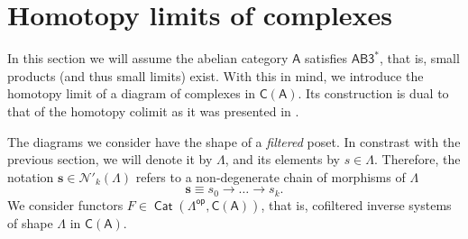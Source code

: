 \documentclass[reqno,11pt]{amsart}
\theoremstyle{plain}
\theoremstyle{remark}
\theoremstyle{definition}
\numberwithin{equation}{thm}
\newcommand{\CN}{\mathcal{N}}
\newcommand{\SA}{\mathsf{A}}
\newcommand{\CCC}{\boldsymbol{\mathsf{C}}}
\newcommand{\op}{\mathsf{op}}
\DeclareMathOperator{\cat}{\mathsf{Cat}}
\begin{document}
\section{Homotopy limits of complexes}\label{Section:homotopy-limit}
	In this section we will assume the abelian category $\SA$ satisfies $\mathsf{AB3^*}$, that is, small products (and thus small limits) exist. With this in mind, we introduce the homotopy limit of a diagram of complexes in $\CCC(\SA)$. Its construction is dual to that of the homotopy colimit as it was presented in \cite[\S 2]{AJS}. 
	
	The diagrams we consider have the shape of a \textit{filtered} poset. In constrast with the previous section, we will denote it by $\Lambda$, and its elements by $s \in \Lambda$. Therefore, the notation $\textbf{s} \in \CN'_k(\Lambda)$ refers to a non-degenerate chain of morphisms of $\Lambda$ 
	\[
		\textbf{s} \equiv s_0 \to \dots \to s_k. 
	\]
	We consider functors $F \in \cat(\Lambda^\op, \CCC(\SA))$, that is, cofiltered inverse systems of shape $\Lambda$ in $\CCC(\SA)$.
	
\end{document}
